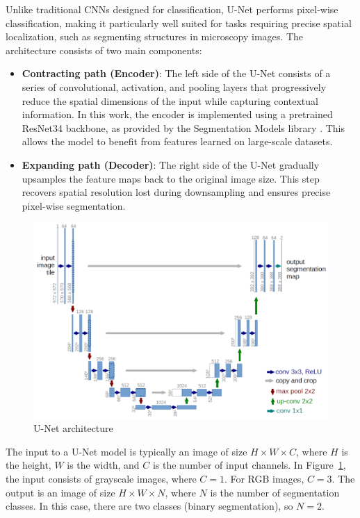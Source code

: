 Unlike traditional CNNs designed for classification, U-Net performs pixel-wise classification, making it particularly well suited for tasks requiring precise spatial localization, such as segmenting structures in microscopy images. The architecture consists of two main components:

\begin{itemize}
    \item \textbf{Contracting path (Encoder)}: The left side of the U-Net consists of a series of convolutional, activation, and pooling layers that progressively reduce the spatial dimensions of the input while capturing contextual information. In this work, the encoder is implemented using a pretrained ResNet34 backbone, as provided by the Segmentation Models library \cite{SegmentationModelsPyTorch}. This allows the model to benefit from features learned on large-scale datasets.
    
    \item \textbf{Expanding path (Decoder)}: The right side of the U-Net gradually upsamples the feature maps back to the original image size. This step recovers spatial resolution lost during downsampling and ensures precise pixel-wise segmentation.
\end{itemize}

\begin{figure}[H]
    \centering
    \includegraphics[width=0.8\linewidth]{PICTURES/unet-architecture.png}
    \caption{U-Net architecture \cite{ronneberger_u-net_2015}}
    \label{fig:unet-architecture}
\end{figure}

The input to a U-Net model is typically an image of size $H \times W \times C$, where $H$ is the height, $W$ is the width, and $C$ is the number of input channels. In Figure~\ref{fig:unet-architecture}, the input consists of grayscale images, where $C = 1$. For RGB images, $C = 3$. The output is an image of size $H \times W \times N$, where $N$ is the number of segmentation classes. In this case, there are two classes (binary segmentation), so $N = 2$.

